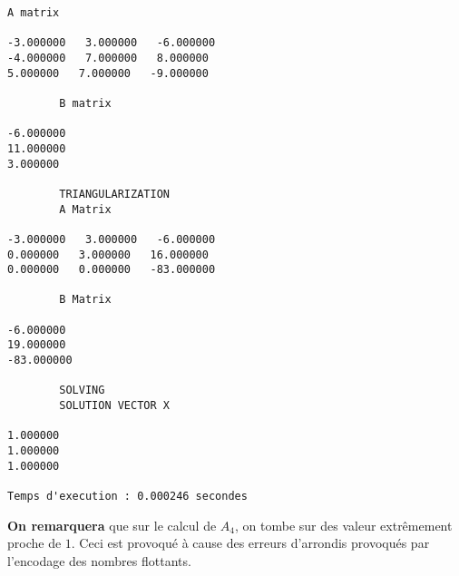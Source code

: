 \documentclass{report}
\begin{document}
\begin{lstlisting}[caption={$A_6X=B$} results, basicstyle=\fontsize{4}{6}\selectfont]
		A matrix 

-3.000000   3.000000   -6.000000   
-4.000000   7.000000   8.000000   
5.000000   7.000000   -9.000000   

		B matrix 

-6.000000   
11.000000   
3.000000   

		TRIANGULARIZATION 
		A Matrix 

-3.000000   3.000000   -6.000000   
0.000000   3.000000   16.000000   
0.000000   0.000000   -83.000000   

		B Matrix 

-6.000000   
19.000000   
-83.000000   

		SOLVING 
		SOLUTION VECTOR X 

1.000000   
1.000000   
1.000000   

Temps d'execution : 0.000246 secondes
\end{lstlisting}

\textbf{On remarquera} que sur le calcul de $A_4$, on tombe sur des valeur extrêmement proche de $1$. Ceci est provoqué à cause des erreurs d'arrondis provoqués par l'encodage des nombres flottants.
\end{document}
